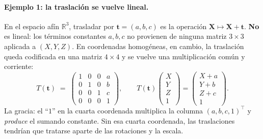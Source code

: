 \documentclass[11pt,a4paper]{article}
\newcommand{\R}{\mathbb{R}}
\begin{document}
\paragraph{Ejemplo 1: la traslación se vuelve lineal.}
En el espacio afín $\R^3$, trasladar por $\mathbf t=(a,b,c)$ es la
operación $\mathbf X\mapsto \mathbf X+\mathbf t$. \textbf{No} es lineal:
los términos constantes $a,b,c$ no provienen de ninguna matriz
$3\times 3$ aplicada a $(X,Y,Z)$. En coordenadas homogéneas, en cambio,
la traslación queda codificada en una matriz $4\times 4$ y se vuelve
una multiplicación común y corriente:
\[
  T(\mathbf t)\;=\;
  \begin{pmatrix}
    1 & 0 & 0 & a\\
    0 & 1 & 0 & b\\
    0 & 0 & 1 & c\\
    0 & 0 & 0 & 1
  \end{pmatrix},
  \qquad
  T(\mathbf t)\!\begin{pmatrix} X\\ Y\\ Z\\ 1\end{pmatrix}
  =\begin{pmatrix} X+a\\ Y+b\\ Z+c\\ 1\end{pmatrix}.
\]
La gracia: el ``$1$'' en la cuarta coordenada multiplica la columna
$(a,b,c,1)^\top$ y \emph{produce} el sumando constante. Sin esa cuarta
coordenada, las traslaciones tendrían que tratarse aparte de las
rotaciones y la escala.
\end{document}
